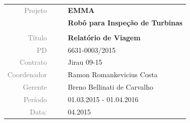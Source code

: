 \vspace{4cm}

\begin{table}[ht!]
	\centering
	\begin{tabular}{r l|l p{12cm} }
		\textcolor{gray}{Projeto} &&& \textbf{\Large EMMA}\\
			&&& \textbf{Robô para Inspeção de Turbinas}\\
			&&& \\
		\textcolor{gray}{Título} &&& \textbf{Relatório de Viagem}\\
		\textcolor{gray}{PD} &&& 6631-0003/2015 \\
		\textcolor{gray}{Contrato} &&& Jirau 09-15\\
		\textcolor{gray}{Coordenador} &&& Ramon Romankevicius Costa \\
		\textcolor{gray}{Gerente} &&& Breno Bellinati de Carvalho \\
		\textcolor{gray}{Período} &&& 01.03.2015 - 01.04.2016 \\
		\textcolor{gray}{Data:} &&& 04.2015 \\
	\end{tabular}
\end{table}


\cleardoublepage


